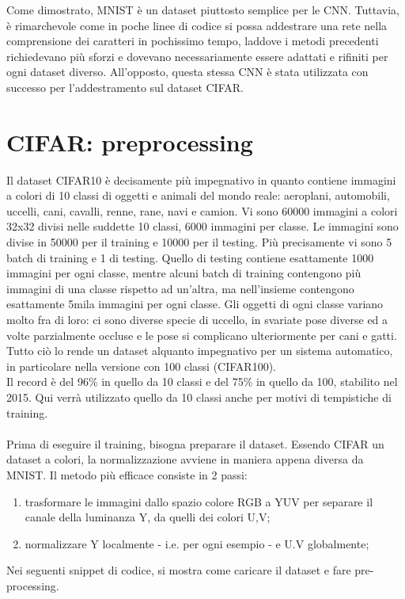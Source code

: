 Come dimostrato, MNIST è un dataset piuttosto semplice per le CNN. Tuttavia, è rimarchevole come in poche linee di codice si possa addestrare una rete nella comprensione dei caratteri in pochissimo tempo, laddove i metodi precedenti richiedevano più sforzi e dovevano necessariamente essere adattati e rifiniti per ogni dataset diverso. All'opposto, questa stessa CNN è stata utilizzata con successo per l'addestramento sul dataset CIFAR. 

\section{CIFAR: preprocessing}
Il dataset CIFAR10 è decisamente più impegnativo in quanto contiene immagini a colori di 10 classi di oggetti e animali del mondo reale: aeroplani, automobili, uccelli, cani, cavalli, renne, rane, navi e camion. Vi sono 60000 immagini a colori 32x32 divisi nelle suddette 10 classi, 6000 immagini per classe. Le immagini sono divise in 50000 per il training e 10000 per il testing. Più precisamente vi sono 5 batch di training e 1 di testing. Quello di testing contiene esattamente 1000 immagini per ogni classe, mentre alcuni batch di training contengono più immagini di una classe rispetto ad un’altra, ma nell’insieme contengono esattamente 5mila immagini per ogni classe.
Gli oggetti di ogni classe variano molto fra di loro: ci sono diverse specie di uccello, in svariate pose diverse ed a volte parzialmente occluse e le pose si complicano ulteriormente per cani e gatti. Tutto ciò lo rende un dataset alquanto impegnativo per un sistema automatico, in particolare nella versione con 100 classi (CIFAR100). 
\\
Il record è del 96\% in quello da 10 classi e del 75\% in quello da 100, stabilito nel 2015\parencite{Wcifar}. Qui verrà utilizzato quello da 10 classi anche per motivi di tempistiche di training. \\
\\
Prima di eseguire il training, bisogna preparare il dataset. Essendo CIFAR un dataset a colori, la normalizzazione avviene in maniera appena diversa da MNIST. Il metodo più efficace consiste in 2 passi: 
\begin{enumerate}
\item trasformare le immagini dallo spazio colore RGB a YUV per separare il canale della luminanza Y, da quelli dei colori U,V; 
\item normalizzare Y localmente - i.e. per ogni esempio - e U.V globalmente;
\end{enumerate} 
Nei seguenti snippet di codice, si mostra come caricare il dataset e fare pre-processing.

